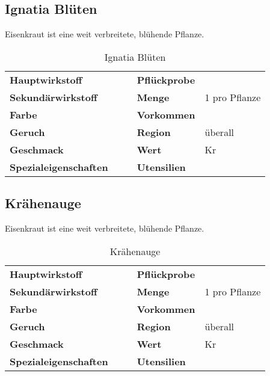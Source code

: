 \subsection{Ignatia Blüten}
Eisenkraut ist eine weit verbreitete, blühende Pflanze. 

\begin{table}[h]
\begin{center}
\begin{tabular}{|l|l|p{1cm}|l|l|}
	\cline{1-2} \cline{4-5}
	\textbf{Hauptwirkstoff} &  && \textbf{Pflückprobe} &  \\ \cline{1-2} \cline{4-5}
	\textbf{Sekundärwirkstoff} &  && \textbf{Menge} & 1 pro Pflanze \\ \cline{1-2} \cline{4-5}
	\textbf{Farbe} &  && \textbf{Vorkommen} &  \\ \cline{1-2} \cline{4-5}
	\textbf{Geruch} &  && \textbf{Region} & überall \\ \cline{1-2} \cline{4-5}
	\textbf{Geschmack} &  && \textbf{Wert} & Kr \\ \cline{1-2} \cline{4-5}
	\textbf{Spezialeigenschaften} &  && \textbf{Utensilien} &  \\ \cline{1-2} \cline{4-5}
\end{tabular}
\end{center}
\caption{Ignatia Blüten}
\label{tab:ignatia_blueten}
\end{table}


\subsection{Krähenauge}
Eisenkraut ist eine weit verbreitete, blühende Pflanze. 

\begin{table}[h]
\begin{center}
\begin{tabular}{|l|l|p{1cm}|l|l|}
	\cline{1-2} \cline{4-5}
	\textbf{Hauptwirkstoff} &  && \textbf{Pflückprobe} &  \\ \cline{1-2} \cline{4-5}
	\textbf{Sekundärwirkstoff} &  && \textbf{Menge} & 1 pro Pflanze \\ \cline{1-2} \cline{4-5}
	\textbf{Farbe} &  && \textbf{Vorkommen} &  \\ \cline{1-2} \cline{4-5}
	\textbf{Geruch} &  && \textbf{Region} & überall \\ \cline{1-2} \cline{4-5}
	\textbf{Geschmack} &  && \textbf{Wert} & Kr \\ \cline{1-2} \cline{4-5}
	\textbf{Spezialeigenschaften} &  && \textbf{Utensilien} &  \\ \cline{1-2} \cline{4-5}
\end{tabular}
\end{center}
\caption{Krähenauge}
\label{tab:kraehenauge}
\end{table}


